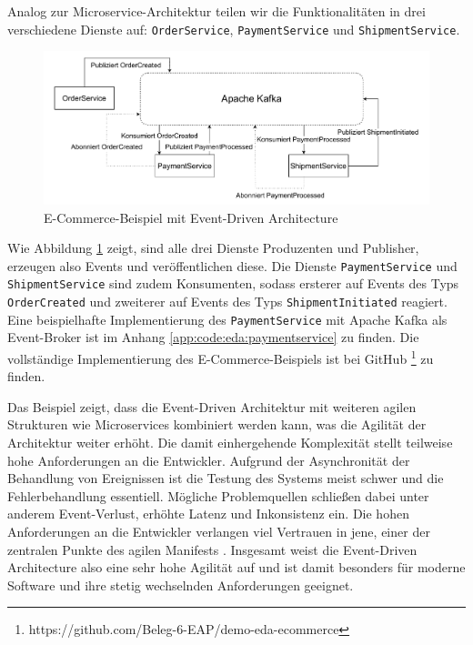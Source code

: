 \documentclass[acmtog]{acmart}
\begin{document}
Analog zur Microservice-Architektur teilen wir die Funktionalitäten in drei verschiedene Dienste auf: \texttt{OrderService}, \texttt{PaymentService} und \texttt{ShipmentService}.

\begin{figure}[!h]
  \centering
  \includegraphics[width=\linewidth]{images/eda/eda-ecommerce.drawio}
  \caption{E-Commerce-Beispiel mit Event-Driven Architecture}
  \label{fig:edaecommerce}
\end{figure}
Wie Abbildung \ref{fig:edaecommerce} zeigt, sind alle drei Dienste Produzenten und Publisher, erzeugen also Events und veröffentlichen diese.
Die Dienste \texttt{PaymentService} und \texttt{ShipmentService} sind zudem Konsumenten,
sodass ersterer auf Events des Typs \texttt{OrderCreated} und zweiterer auf Events des Typs \texttt{ShipmentInitiated} reagiert.
Eine beispielhafte Implementierung des \texttt{PaymentService} mit Apache Kafka als Event-Broker ist im Anhang \ref{app:code:eda:paymentservice} zu finden.
Die vollständige Implementierung des E-Commerce-Beispiels ist bei GitHub \footnote{https://github.com/Beleg-6-EAP/demo-eda-ecommerce} zu finden.

Das Beispiel zeigt, dass die Event-Driven Architektur mit weiteren agilen Strukturen wie Microservices kombiniert werden kann, was die Agilität der Architektur weiter erhöht.
Die damit einhergehende Komplexität stellt teilweise hohe Anforderungen an die Entwickler.
Aufgrund der Asynchronität der Behandlung von Ereignissen ist die Testung des Systems meist schwer und die Fehlerbehandlung essentiell.
Mögliche Problemquellen schließen dabei unter anderem Event-Verlust, erhöhte Latenz und Inkonsistenz ein.
Die hohen Anforderungen an die Entwickler verlangen viel Vertrauen in jene, einer der zentralen Punkte des agilen Manifests \cite{agileManifesto}.
Insgesamt weist die Event-Driven Architecture also eine sehr hohe Agilität auf und ist damit besonders für moderne Software und ihre stetig wechselnden Anforderungen geeignet.
\end{document}
